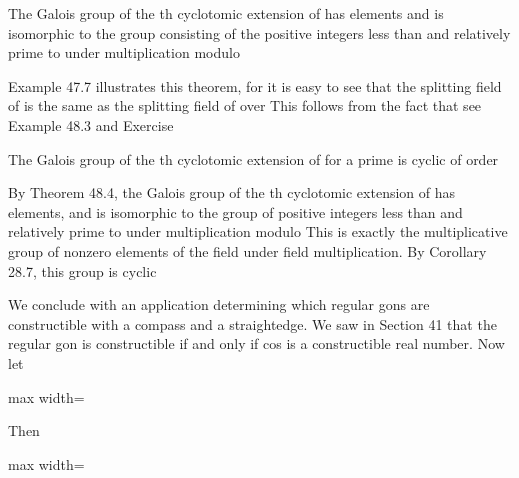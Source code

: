 \documentclass[11pt,oneside]{article}
\begin{document}
\begin{BookBody}
 The Galois group of the th cyclotomic extension of  has  elements and is isomorphic to the group consisting of the positive integers less than  and relatively prime to  under multiplication modulo 

 Example 47.7 illustrates this theorem, for it is easy to see that the splitting field of  is the same as the splitting field of  over  This follows from the fact that see Example 48.3 and Exercise \BookEnd{\blacktriangle}

 The Galois group of the th cyclotomic extension of  for a prime  is cyclic of order 

 By Theorem 48.4, the Galois group of the th cyclotomic extension of  has   elements, and is isomorphic to the group of positive integers less than  and relatively prime to  under multiplication modulo  This is exactly the multiplicative group  of nonzero elements of the field  under field multiplication. By Corollary 28.7, this group is cyclic\BookEnd{\blacklozenge}


\noindent We conclude with an application determining which regular gons are constructible with a compass and a straightedge. We saw in Section 41 that the regular gon is constructible if and only if cos is a constructible real number. Now let

\begin{center}\begin{adjustbox}{max width=\linewidth}\end{adjustbox}\end{center}

\noindent Then

\begin{center}\begin{adjustbox}{max width=\linewidth}\end{adjustbox}\end{center}


\end{BookBody}
\end{document}
